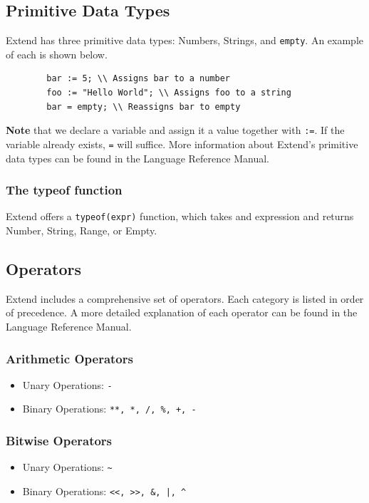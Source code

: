 	\subsection{Primitive Data Types}
	Extend has three primitive data types: Numbers, Strings, and \texttt{empty}. An example of each is shown below.

	\begin{lstlisting}
		bar := 5; \\ Assigns bar to a number
		foo := "Hello World"; \\ Assigns foo to a string
		bar = empty; \\ Reassigns bar to empty
	\end{lstlisting}

	\medskip \noindent
	\textbf{Note} that we declare a variable and assign it a value together with \texttt{:=}. If the variable already exists, \texttt{=} will suffice.
	More information about Extend's primitive data types can be found in the Language Reference Manual.

		\subsubsection{The typeof function}
		Extend offers a \texttt{typeof(expr)} function, which takes and expression and returns Number, String, Range, or Empty.

	\subsection{Operators}
	Extend includes a comprehensive set of operators. Each category is listed in order of precedence. A more detailed explanation of each operator can be found in the Language Reference Manual.

		\subsubsection{Arithmetic Operators}
			\begin{itemize}
				\item Unary Operations: \texttt{-}
				\item Binary Operations: \texttt{**, *, /, \%, +, -}
			\end{itemize}

		\subsubsection{Bitwise Operators}
			\begin{itemize}
				\item Unary Operations: \texttt{\~}
				\item Binary Operations: \texttt{<<, >>, \&, |, \^}
			\end{itemize}

